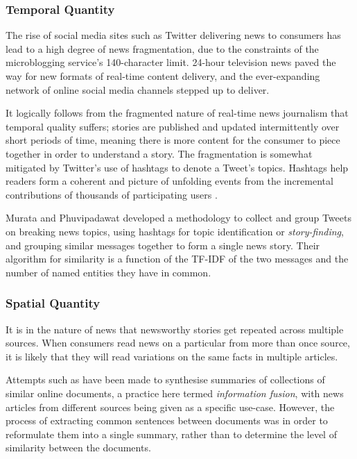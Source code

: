 \subsubsection{Temporal Quantity}

The rise of social media sites such as Twitter delivering news to consumers has lead to a high degree of news fragmentation, due to the constraints of the microblogging service's 140-character limit. 24-hour television news paved the way for new formats of real-time content delivery, and the ever-expanding network of online social media channels stepped up to deliver. 

It logically follows from the fragmented nature of real-time news journalism that temporal quality suffers; stories are published and updated intermittently over short periods of time, meaning there is more content for the consumer to piece together in order to understand a story. The fragmentation is somewhat mitigated by Twitter's use of hashtags to denote a Tweet's topics. Hashtags help readers form a coherent and picture of unfolding events from the incremental contributions of thousands of participating users \citep{BlogsTwitterAndBreakingNews}.


Murata and Phuvipadawat \citep{BreakingNewsDetectionAndTrackingInTwitter} developed a methodology to collect and group Tweets on breaking news topics, using hashtags for topic identification or \textit{story-finding}, and grouping similar messages together to form a single news story. Their algorithm for similarity is a function of the TF-IDF \citep{TermWeightingApproachesInAutomaticTextRetrieval} of the two messages and the number of named entities they have in common.

\subsubsection{Spatial Quantity}
It is in the nature of news that newsworthy stories get repeated across multiple sources. When consumers read news on a particular from more than once source, it is likely that they will read variations on the same facts in multiple articles.

Attempts such as \citep{InformationFusionInTheContextOfMultiDocumentSummarization} have been made to synthesise summaries of collections of similar online documents, a practice here termed \textit{information fusion}, with news articles from different sources being given as a specific use-case. However, the process of extracting common sentences between documents was in order to reformulate them into a single summary, rather than to determine the level of similarity between the documents.

